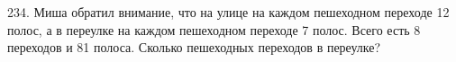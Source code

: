 234. Миша обратил внимание, что на улице на каждом пешеходном переходе 12 полос, а в переулке на каждом пешеходном переходе 7 полос. Всего есть 8 переходов и 81 полоса. Сколько пешеходных переходов в переулке?\\
